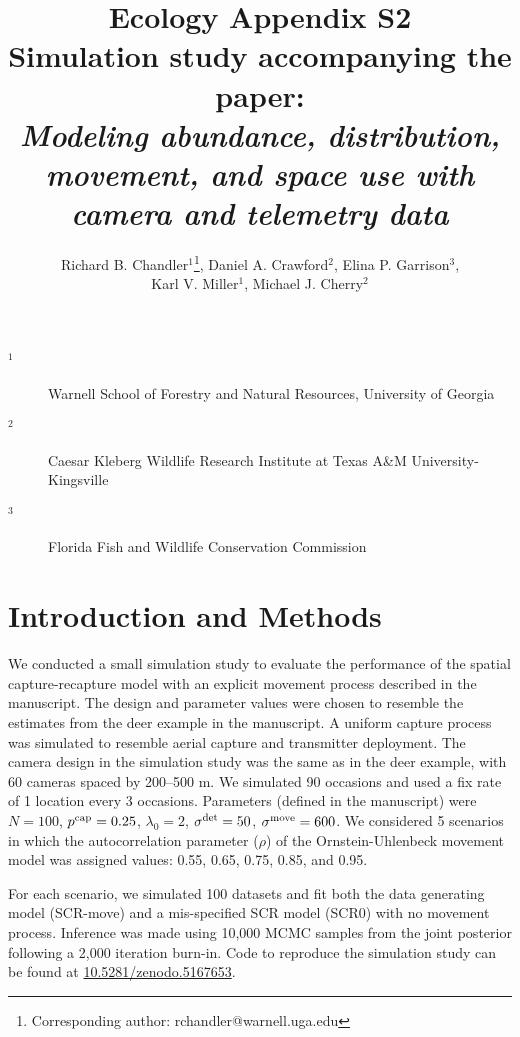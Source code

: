 \documentclass[12pt]{article}
\title{Ecology Appendix S2 \\ Simulation study accompanying the paper: \\ \it Modeling abundance, distribution, movement, and space
  use with camera and telemetry data}
\author{Richard B. Chandler$^1$\footnote{Corresponding author: rchandler@warnell.uga.edu}, Daniel A. Crawford$^2$, Elina P. Garrison$^3$, \\
  Karl V. Miller$^1$, Michael J. Cherry$^2$}
\begin{document}
\maketitle

\vspace{12pt}

\begin{description}%
\item[$^1$] Warnell School of Forestry and Natural Resources, University of Georgia %
\item[$^2$] Caesar Kleberg Wildlife Research Institute at Texas A\&M University-Kingsville %
\item[$^3$] Florida Fish and Wildlife Conservation Commission %
\end{description}

\clearpage

\section*{Introduction and Methods}

We conducted a small simulation study to evaluate the performance of the
spatial capture-recapture model with an explicit movement process
described in the manuscript.
The design and parameter values were chosen to resemble the estimates
from the deer example in the manuscript. A uniform capture process was
simulated to resemble aerial capture and transmitter
deployment. The camera design in the simulation study was the same as
in the deer example, with 60 cameras spaced by 200--500 m. We simulated
90 occasions and used a fix rate of 1 location every 3
occasions. Parameters (defined in the manuscript) were $N=100$,
$p^{\rm cap}=0.25$, $\lambda_0=2$, $\sigma^{{\rm det}}=50$,
$\sigma^{\rm move}=600$. We 
considered 5 scenarios in which the autocorrelation parameter ($\rho$)
of the Ornstein-Uhlenbeck movement model was assigned values: 0.55,
0.65, 0.75, 0.85, and 0.95. 

For each scenario, we simulated 100 datasets and fit both
the data generating model (SCR-move) and a mis-specified SCR model
(SCR0) with no movement process. Inference was made using 10,000 MCMC
samples from the joint posterior following a 2,000 iteration
burn-in. Code to reproduce the simulation study can be found at
\url{10.5281/zenodo.5167653}.
\end{document}
